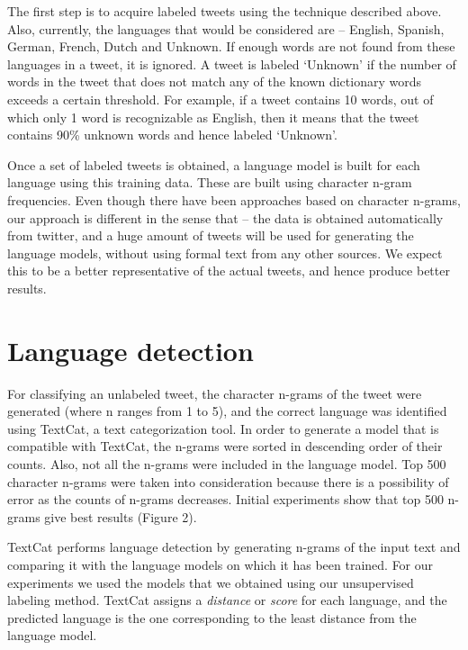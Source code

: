 \documentclass[11pt]{article}
\begin{document}
The first step is to acquire labeled tweets using the technique described above. Also, currently, the languages that would be considered are -- English, Spanish, German, French, Dutch and Unknown. If enough words are not found from these languages in a tweet, it is ignored. A tweet is labeled `Unknown' if the number of words in the tweet that does not match any of the known dictionary words exceeds a certain threshold. For example, if a tweet contains 10 words, out of which only 1 word is recognizable as English, then it means that the tweet contains 90\% unknown words and hence labeled `Unknown'.	

Once a set of labeled tweets is obtained, a language model is built for each language using this training data. These are built using character n-gram frequencies. Even though there have been approaches based on character n-grams, our approach is different in the sense that -- the data is obtained automatically from twitter, and a huge amount of tweets will be used for generating the language models, without using formal text from any other sources. We expect this to be a better representative of the actual tweets, and hence produce better results.

\section{Language detection}
For classifying an unlabeled tweet, the character n-grams of the tweet were generated (where n ranges from 1 to 5), and the correct language was identified using TextCat, a text categorization tool. In order to generate a model that is compatible with TextCat, the n-grams were sorted in descending order of their counts. Also, not all the n-grams were included in the language model. Top 500 character n-grams were taken into consideration because there is a possibility of error as the counts of n-grams decreases. Initial experiments show that top 500 n-grams give best results (Figure 2).

TextCat performs language detection by generating n-grams of the input text and comparing it with the language models on which it has been trained. For our experiments we used the models that we obtained using our unsupervised labeling method. TextCat assigns a {\em distance} or {\em score} for each language, and the predicted language is the one corresponding to the least distance from the language model.
\end{document}
